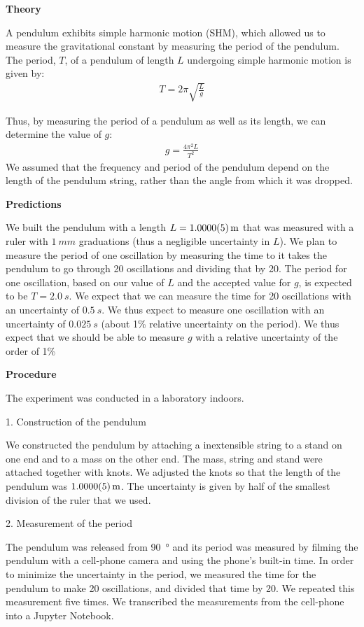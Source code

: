\textbf{Theory}

A pendulum exhibits simple harmonic motion (SHM), which allowed us to measure the gravitational constant by measuring the period of the pendulum. The period, $T$, of a pendulum of length $L$ undergoing simple harmonic motion is given by:
\begin{align*}
T=2\pi \sqrt {\frac{L}{g}}
\end{align*}

Thus, by measuring the period of a pendulum as well as its length, we can determine the value of $g$:
\begin{align*}
g=\frac{4\pi^{2}L}{T^{2}}
\end{align*}
We assumed that the frequency and period of the pendulum depend on the length of the pendulum string, rather than the angle from which it was dropped. 

\textbf{Predictions}

We built the pendulum with a length $L=\SI{1.0000\pm 0.0005}{m}$ that was measured with a ruler with $\SI{1}{mm}$ graduations (thus a negligible uncertainty in $L$). We plan to measure the period of one oscillation by measuring the time to it takes the pendulum to go through 20 oscillations and dividing that by 20. The period for one oscillation, based on our value of $L$ and the accepted value for $g$, is expected to be $T=\SI{2.0}{s}$. We expect that we can measure the time for 20 oscillations with an uncertainty of $\SI{0.5}{s}$. We thus expect to measure one oscillation with an uncertainty of $\SI{0.025}{s}$ (about 1\% relative uncertainty on the period). We thus expect that we should be able to measure $g$ with a relative uncertainty of the order of 1\%


\textbf{Procedure}

The experiment was conducted in a laboratory indoors.

1. Construction of the pendulum

We constructed the pendulum by attaching a inextensible string to a stand on one end and to a mass on the other end. The mass, string and stand were attached together with knots. We adjusted the knots so that the length of the pendulum was $\SI{1.0000\pm0.0005}{m}$. The uncertainty is given by half of the smallest division of the ruler that we used.


2. Measurement of the period

The pendulum was released from \SI{90}{\degree} and its period was measured by filming the pendulum with a cell-phone camera and using the phone's built-in time. In order to minimize the uncertainty in the period, we measured the time for the pendulum to make 20 oscillations, and divided that time by 20. We repeated this measurement five times. We transcribed the measurements from the cell-phone into a Jupyter Notebook.


